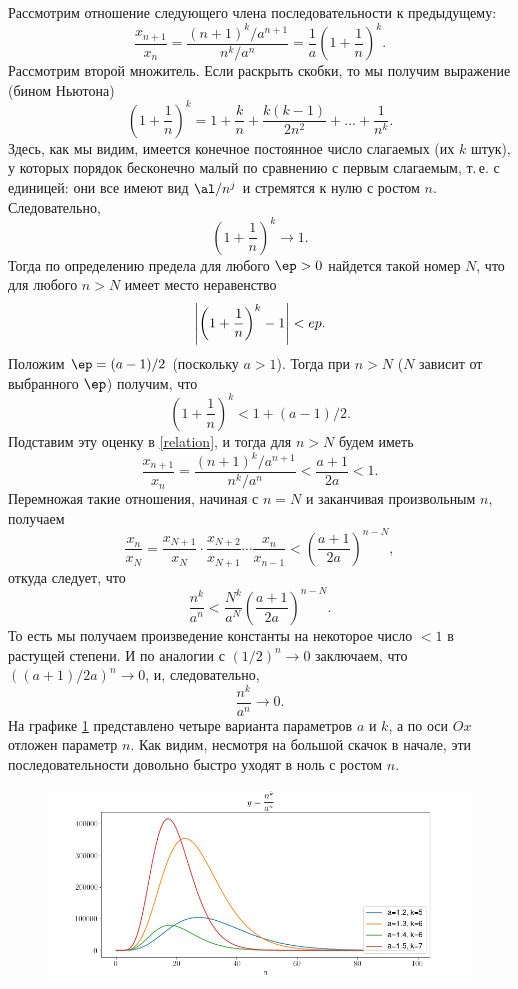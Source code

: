 \begin{enumerate}
Рассмотрим отношение следующего члена последовательности к предыдущему:
\begin{equation}\label{relation}
\frac{x_{n+1}}{x_n}=\frac{(n+1)^k/a^{n+1}}{n^k/a^n} = \frac 1a\left(1+\frac 1n\right)^k.
\end{equation}
Рассмотрим второй множитель. Если раскрыть скобки, то мы получим выражение (бином Ньютона)
$$
\left(1+\frac 1n\right)^k = 1 + \frac kn + \frac{k(k-1)}{2n^2} + \dots + \frac{1}{n^k}.
$$
Здесь, как мы видим, имеется конечное постоянное число слагаемых (их $k$ штук), у которых порядок бесконечно малый по сравнению с первым слагаемым, т.\,е. с единицей: они все имеют вид $\al/n^j$ и стремятся к нулю с ростом $n$. Следовательно,
$$
\left(1+\frac 1n\right)^k \to 1.
$$
Тогда по определению предела для любого $\ep>0$ найдется такой номер $N$, что для любого $n>N$ имеет место неравенство
$$
\left|\left(1+\frac 1n\right)^k-1\right|<\\ep.
$$
Положим $\ep=(a-1)/2$ (поскольку $a>1$). Тогда при $n>N$ ($N$ зависит от выбранного $\ep$) получим, что
$$
\left(1+\frac 1n\right)^k<1+(a-1)/2.
$$
Подставим эту оценку в \eqref{relation}, и тогда для $n>N$ будем иметь
$$
\frac{x_{n+1}}{x_n}=\frac{(n+1)^k/a^{n+1}}{n^k/a^n} < \frac{a+1}{2a} < 1.
$$
Перемножая такие отношения, начиная с $n=N$ и заканчивая произвольным $n$, получаем
$$
\frac{x_n}{x_N}=\frac{x_{N+1}}{x_N}\cdot \frac{x_{N+2}}{x_{N+1}}\cdots \frac{x_n}{x_{n-1}}
<\left(\frac{a+1}{2a}\right)^{n-N},
$$
откуда следует, что
$$
\frac{n^k}{a^n} < \frac{N^k}{a^N}\left(\frac{a+1}{2a}\right)^{n-N}.
$$
То есть мы получаем произведение константы на некоторое число $<1$ в растущей степени. И по аналогии с $(1/2)^n\to 0$ заключаем, что $((a+1)/2a)^{n}\to 0$, и, следовательно,
$$
\frac{n^k}{a^n}\to 0.
$$
На графике \ref{power} представлено четыре варианта параметров $a$ и $k$, а по оси $Ox$ отложен параметр $n$. Как видим, несмотря на большой скачок в начале, эти последовательности довольно быстро уходят в ноль с ростом $n$.
\begin{figure}[hbt!]
\begin{center}
\includegraphics[scale=0.5]{power.png}
\end{center}\caption{}\label{power}
\end{figure}



\end{enumerate}
